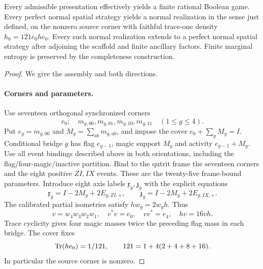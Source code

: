 \begin{lemma}\label{lem:four}
Every admissible presentation effectively yields a finite rational Boolean game. Every perfect normal spatial strategy yields a normal realization in the sense just defined, on the nonzero source corner with faithful trace-one density $h_0=121e_0he_0$. Every such normal realization extends to a perfect normal spatial strategy after adjoining the scaffold and finite ancillary factors. Finite marginal entropy is preserved by the completeness construction.
\end{lemma}
\begin{proof}
We give the assembly and both directions.

\paragraph{Corners and parameters.}
Use seventeen orthogonal synchronized corners
\[
 e_0;\quad m_{g,00},m_{g,01},m_{g,10},m_{g,11}\quad(1\leq g\leq4).
\]
Put $e_g=m_{g,00}$ and $M_g=\sum_{ab}m_{g,ab}$, and impose the cover $e_0+\sum_gM_g=I$. Conditional bridge $g$ has flag $e_{g-1}$, magic support $M_g$ and activity $e_{g-1}+M_g$. Use all event bindings described above in both orientations, including the flag/four-magic/inactive partition. Bind to the qutrit frame the seventeen corners and the eight positive $ZI,IX$ events. These are the twenty-five frame-bound parameters. Introduce eight axis labels $\mathfrak x_g,\mathfrak z_g$ with the explicit equations
\[
 \mathfrak x_g=I-2M_g+2E_{g,ZI,+},\qquad
 \mathfrak z_g=I-2M_g+2E_{g,IX,+}.
\]
The calibrated partial isometries satisfy $hw_g=2w_gh$. Thus
\begin{equation}\label{eq:fourv}
 v=w_4w_3w_2w_1,\quad v^*v=e_0,\quad vv^*=e_4,\quad hv=16vh.
\end{equation}
Trace cyclicity gives four magic masses twice the preceding flag mass in each bridge. The cover fixes
\begin{equation}\label{eq:121}
 \operatorname{Tr}(he_0)=1/121,\qquad 121=1+4(2+4+8+16).
\end{equation}
In particular the source corner is nonzero.


\end{proof}
